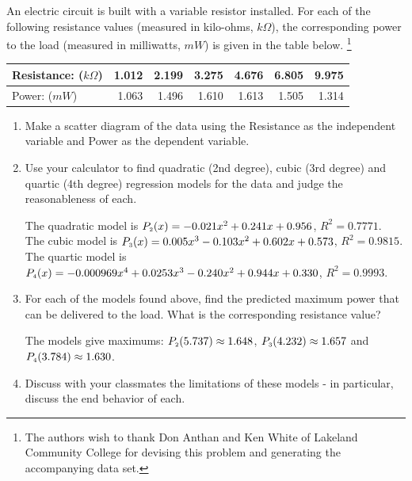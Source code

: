 \documentclass{ximera}
\begin{document}
\begin{problem}\label{circuitexercisepoly}
An electric circuit is built with a variable resistor installed.  For each of the following resistance values (measured in kilo-ohms, $k \Omega$),  the corresponding power to the load (measured in milliwatts, $mW$) is given in the table below. \footnote{The authors wish to thank Don Anthan and Ken White of Lakeland Community College for devising this problem and generating the accompanying data set.}

\noindent \begin{tabular}{|l|r|r|r|r|r|r|} \hline
Resistance: ($k \Omega$) & 1.012 & 2.199 & 3.275 & 4.676 & 6.805 & 9.975 \\ \hline
Power: ($mW$) & 1.063 & 1.496 & 1.610 & 1.613 & 1.505 & 1.314 \\ \hline
\end{tabular}

\begin{enumerate}

\item Make a scatter diagram of the data using the Resistance as the independent variable and Power as the dependent variable.

\item Use your calculator to find quadratic (2nd degree), cubic (3rd degree) and quartic (4th degree) regression models for the data and judge the reasonableness of each.

\begin{solution}
    The quadratic model is $P_{\mbox{\tiny $2$}}(x) = -0.021x^{2} + 0.241x + 0.956$, $R^{2} = 0.7771$. \\
The cubic model is $P_{\mbox{\tiny $3$}}(x) = 0.005x^{3} - 0.103x^{2} + 0.602x + 0.573$,  $R^{2} = 0.9815$. \\
The quartic model is $P_{\mbox{\tiny $4$}}(x) = -0.000969x^{4} + 0.0253x^{3} - 0.240x^{2} + 0.944x + 0.330$,  $R^{2} = 0.9993$.
\end{solution}

\item For each of the models found above, find the predicted maximum power that can be delivered to the load.  What is the corresponding resistance value?

\begin{solution}
    The models give maximums: $P_{\mbox{\tiny $2$}}(5.737) \approx 1.648$, $P_{\mbox{\tiny $3$}}(4.232) \approx 1.657$ and $P_{\mbox{\tiny $4$}}(3.784) \approx 1.630$.
\end{solution}

\item Discuss with your classmates the limitations of these models - in particular, discuss the end behavior of each.


\end{enumerate}
\end{problem}
\end{document}
